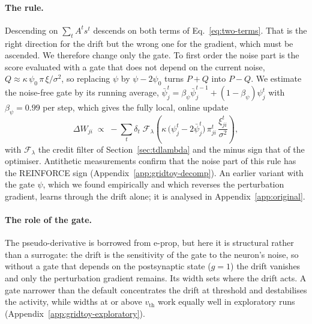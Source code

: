 \documentclass[10pt,twocolumn]{article}
\begin{document}
\paragraph{The rule.}
Descending on $\sum_tA^ts^t$ descends on both terms of
Eq.~\eqref{eq:two-terms}. That is the right direction for the drift but the wrong
one for the gradient, which must be ascended. We therefore change only the gate.
To first order the noise part is the score evaluated with a gate that does not
depend on the current noise, $Q\approx\kappa\,\psi_0\,\pi\,\xi/\sigma^2$, so
replacing $\psi$ by $\psi-2\psi_0$ turns $P+Q$ into $P-Q$. We estimate the
noise-free gate by its running average,
$\bar\psi^t_j=\beta_\psi\bar\psi^{t-1}_j+(1-\beta_\psi)\psi^t_j$ with
$\beta_\psi=0.99$ per step, which gives the fully local, online update
\begin{equation}
\Delta W_{ji}\;\propto\;-\sum_t \delta_t\;\mathcal{F}_{\lambda}\!\left(
\kappa\,\big(\psi^t_j-2\bar\psi^t_j\big)\,\pi^t_{ji}\,
\frac{\xi^t_{ji}}{\sigma^2}\right),
\label{eq:distributed-update}
\end{equation}
with $\mathcal{F}_\lambda$ the credit filter of Section~\ref{sec:tdlambda} and the
minus sign that of the optimiser. Antithetic measurements confirm that the noise
part of this rule has the REINFORCE sign (Appendix~\ref{app:gridtoy-decomp}). An
earlier variant with the gate $\psi$, which we found empirically and which
reverses the perturbation gradient, learns through the drift alone; it is
analysed in Appendix~\ref{app:original}.

\paragraph{The role of the gate.}
The pseudo-derivative is borrowed from e-prop, but here it is structural rather
than a surrogate: the drift is the sensitivity of the gate to the neuron's noise,
so without a gate that depends on the postsynaptic state ($g=1$) the drift
vanishes and only the perturbation gradient remains. Its width sets where the
drift acts. A gate narrower than the default concentrates the drift at threshold
and destabilises the activity, while widths at or above $v_{\mathrm{th}}$ work
equally well in exploratory runs (Appendix~\ref{app:gridtoy-exploratory}).
\end{document}
